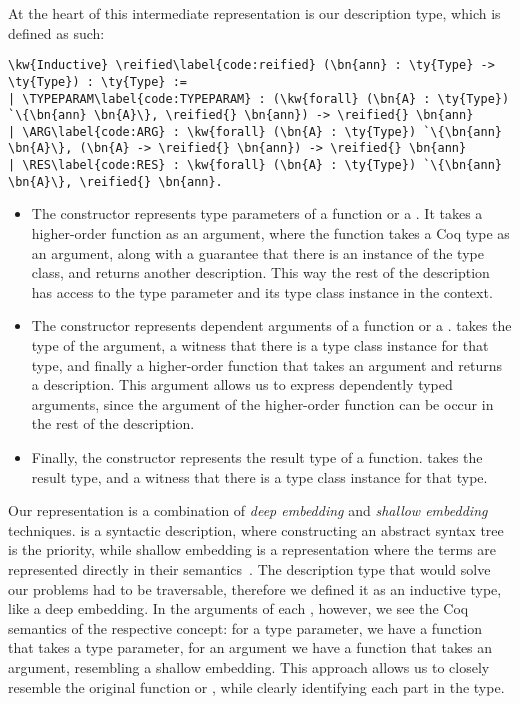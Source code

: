 At the heart of this intermediate representation is our description type, which is defined as such:

\newcommand{\reified}{\hyperref[code:reified]{\ty{reified}}}
\newcommand{\TYPEPARAM}{\hyperref[code:TYPEPARAM]{\dt{TYPEPARAM}}}
\newcommand{\ARG}{\hyperref[code:ARG]{\dt{ARG}}}
\newcommand{\RES}{\hyperref[code:RES]{\dt{RES}}}
\begin{Verbatim}
\kw{Inductive} \reified\label{code:reified} (\bn{ann} : \ty{Type} -> \ty{Type}) : \ty{Type} :=
| \TYPEPARAM\label{code:TYPEPARAM} : (\kw{forall} (\bn{A} : \ty{Type}) `\{\bn{ann} \bn{A}\}, \reified{} \bn{ann}) -> \reified{} \bn{ann}
| \ARG\label{code:ARG} : \kw{forall} (\bn{A} : \ty{Type}) `\{\bn{ann} \bn{A}\}, (\bn{A} -> \reified{} \bn{ann}) -> \reified{} \bn{ann}
| \RES\label{code:RES} : \kw{forall} (\bn{A} : \ty{Type}) `\{\bn{ann} \bn{A}\}, \reified{} \bn{ann}.
\end{Verbatim}

\begin{itemize}
\item The \TYPEPARAM{} constructor represents type parameters of a function or a \constructor{}. It takes a higher-order function as an argument, where the function takes a Coq type  as an argument, along with a guarantee that there is an instance of the  type class, and returns another \reified{} description. This way the rest of the description has access to the type parameter and its type class instance in the context.

\item The \ARG{} constructor represents dependent arguments of a function or a \constructor{}.
\ARG{} takes the type of the argument, a witness that there is a type class instance for that type, and finally a higher-order function that takes an argument and returns a \reified{} description. This argument allows us to express dependently typed arguments, since the argument of the higher-order function can be occur in the rest of the description.

\item Finally, the \RES{} constructor represents the result type of a function. \RES{} takes the result type, and a witness that there is a type class instance for that type.
\end{itemize}

Our representation is a combination of \emph{\gls{deep embedding}} and \emph{\gls{shallow embedding}} techniques.
 is a syntactic description, where constructing an abstract syntax tree is the priority, while \gls{shallow embedding} is a representation where the terms are represented directly in their semantics~\cite{gibbons2014folding}. The description type that would solve our problems had to be traversable, therefore we defined it as an \gls{inductive type}, like a \gls{deep embedding}. In the arguments of each \constructor{}, however, we see the Coq semantics of the respective concept: for a type parameter, we have a function that takes a type parameter, for an argument we have a function that takes an argument, resembling a \gls{shallow embedding}. This approach allows us to closely resemble the original function or \constructor{}, while clearly identifying each part in the type.

